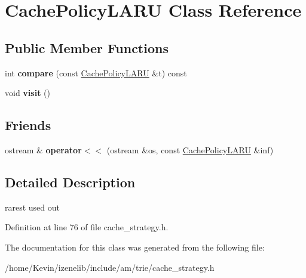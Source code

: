 \hypertarget{classCachePolicyLARU}{
\section{CachePolicyLARU Class Reference}
\label{classCachePolicyLARU}
}
\subsection*{Public Member Functions}
\begin{CompactItemize}
\item 
\hypertarget{classCachePolicyLARU_f2bdf2e9140f1bc06ee104a2517c8513}{
int \textbf{compare} (const \hyperlink{classCachePolicyLARU}{CachePolicyLARU} \&t) const }
\label{classCachePolicyLARU_f2bdf2e9140f1bc06ee104a2517c8513}

\item 
\hypertarget{classCachePolicyLARU_95088534d9cacfdbfe0537896c3fb80f}{
void \textbf{visit} ()}
\label{classCachePolicyLARU_95088534d9cacfdbfe0537896c3fb80f}

\end{CompactItemize}
\subsection*{Friends}
\begin{CompactItemize}
\item 
\hypertarget{classCachePolicyLARU_64bbcdccdca70292295cbdf584942bb3}{
ostream \& \textbf{operator$<$$<$} (ostream \&os, const \hyperlink{classCachePolicyLARU}{CachePolicyLARU} \&inf)}
\label{classCachePolicyLARU_64bbcdccdca70292295cbdf584942bb3}

\end{CompactItemize}


\subsection{Detailed Description}
rarest used out 

Definition at line 76 of file cache\_\-strategy.h.

The documentation for this class was generated from the following file:\begin{CompactItemize}
\item 
/home/Kevin/izenelib/include/am/trie/cache\_\-strategy.h\end{CompactItemize}
